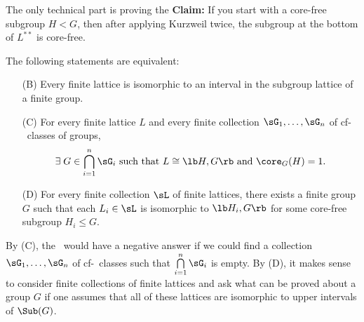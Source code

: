\begin{frame}[label=IEPropsLemma2]{}
The only technical part is proving the
\vskip4mm
{\bf Claim:} If you start with a core-free subgroup $H<G$, then after applying Kurzweil twice, the subgroup at the bottom of $L^{**}$ is core-free.
\vskip4mm
\end{frame}




\begin{frame}[fragile,label=Parachutes0]{}
\begin{theorem}
The following statements are equivalent:
\begin{enumerate}
\item[(B)] Every finite lattice is isomorphic to
  an interval in the subgroup lattice of a finite group.
\item[(C)]
For every finite lattice $L$ and every finite collection $\sG_1, \dots, \sG_n$
of cf-\IE\ classes of groups,
\[
\exists \; G \in \bigcap\limits_{i=1}^n \sG_i \text{ such that $L \cong \lb H,G \rb$
  and $\core_G(H)=1$}.
\]
\item[(D)]
For every finite collection $\sL$ of finite lattices, there exists a finite
group $G$ such that each $L_i \in \sL$ is isomorphic to $\lb H_i, G \rb$ for some
core-free subgroup $H_i\leq G$.
\end{enumerate}
\end{theorem}
\end{frame}

\begin{frame}[fragile,label=Parachutes0]{}
By (C), the \FLRP\ would have a negative answer if we
could find a collection $\sG_1, \dots, \sG_n$ of cf-\IE\ classes
such that $\bigcap\limits_{i=1}^n \sG_i$ is empty.
\vskip6mm
By (D), it makes sense to consider finite collections of finite lattices and ask
what can be proved about a group $G$ if one assumes that all of these lattices are
isomorphic to upper intervals of $\Sub(G)$. 
\vskip6mm
\end{frame}

